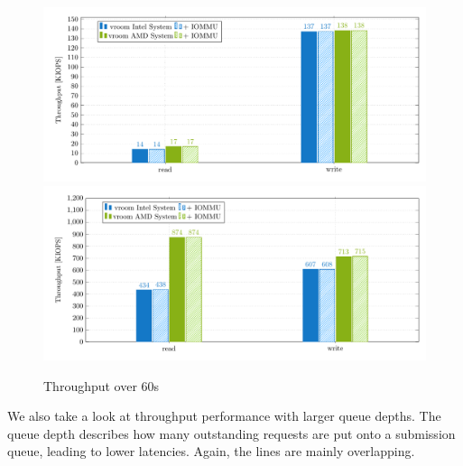 \begin{figure}[H]
  \centering
   {\includegraphics[width=.9\textwidth]{figures/throughput_bar_qd1t1} \label{fig:throughput-qd1t1}}
   {\includegraphics[width=.9\textwidth]{figures/throughput_bar_qd32t4} \label{fig:throughput-qd32t4}}
  \caption{Throughput over 60s}
  \label{fig:throughput-bar}
\end{figure}


We also take a look at throughput performance with larger queue depths. The queue depth describes how many outstanding requests are put onto a submission queue, leading to lower latencies. Again, the lines are mainly overlapping.

